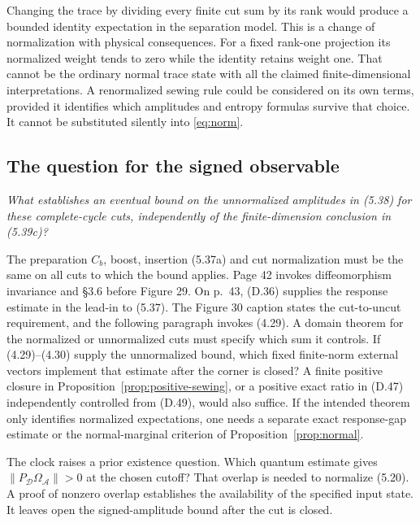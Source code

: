 \documentclass[11pt]{article}
\begin{document}
Changing the trace by dividing every finite cut sum by its rank would produce a bounded identity expectation in the separation model. This is a change of normalization with physical consequences. For a fixed rank-one projection its normalized weight tends to zero while the identity retains weight one. That cannot be the ordinary normal trace state with all the claimed finite-dimensional interpretations. A renormalized sewing rule could be considered on its own terms, provided it identifies which amplitudes and entropy formulas survive that choice. It cannot be substituted silently into \eqref{eq:norm}.

\subsection{The question for the signed observable}
\emph{What establishes an eventual bound on the unnormalized amplitudes in (5.38) for these complete-cycle cuts, independently of the finite-dimension conclusion in (5.39c)?}

The preparation $C_b$, boost, insertion (5.37a) and cut normalization must be the same on all cuts to which the bound applies. Page 42 invokes diffeomorphism invariance and \S3.6 before Figure 29. On p.~43, (D.36) supplies the response estimate in the lead-in to (5.37). The Figure 30 caption states the cut-to-uncut requirement, and the following paragraph invokes (4.29). A domain theorem for the normalized or unnormalized cuts must specify which sum it controls. If (4.29)--(4.30) supply the unnormalized bound, which fixed finite-norm external vectors implement that estimate after the corner is closed? A finite positive closure in Proposition~\ref{prop:positive-sewing}, or a positive exact ratio in (D.47) independently controlled from (D.49), would also suffice. If the intended theorem only identifies normalized expectations, one needs a separate exact response-gap estimate or the normal-marginal criterion of Proposition~\ref{prop:normal}.

The clock raises a prior existence question. Which quantum estimate gives $\|P_{\mathcal D}\Omega_{\mathcal A}\|>0$ at the chosen cutoff? That overlap is needed to normalize (5.20). A proof of nonzero overlap establishes the availability of the specified input state. It leaves open the signed-amplitude bound after the cut is closed.
\end{document}
